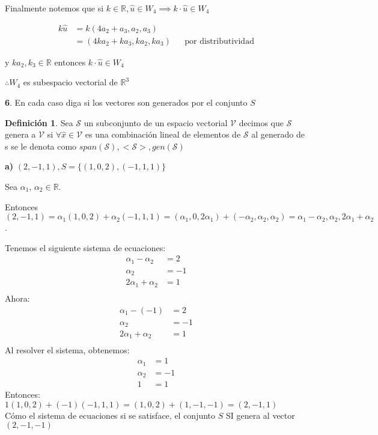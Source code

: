\documentclass[letterpaper]{article}
\newcommand{\R}{\mathds{R}}
\renewcommand{\*}{\cdot}
\theoremstyle{definition}
\newtheorem{definition}{Definición}
\begin{document}
Finalmente notemos que si $ k \in \R, \hat{u} \in W_4 \implies k\* \hat{u} \in W_4 $ 

\begin{align*}
	k\hat{u} & = k(4a_2 + a_3, a_2, a_3)\\
	 & = (4ka_2 + ka_3, ka_2, ka_3) && \text{por distributividad}
\end{align*}

y $ ka_2, k_3 \in \R $ entonces $ k\*\hat{u} \in W_4 $
\begin{center}
	$ \therefore W_4 $ es subespacio vectorial de $ \R^3 $
\end{center}


\noindent \textbf{6}. En cada caso diga si los vectores son generados por el conjunto $S$ \\

\begin{definition}
	Sea $ \mathcal{S} $ un subconjunto de un espacio vectorial $ \mathcal{V} $ decimos que $ \mathcal{S} $ genera a $ \mathcal{V} $ si $ \forall \hat{x} \in \mathcal{V} $ es una combinación lineal de elementos de $ \mathcal{S} $ al generado de s se le denota como $ span(\mathcal{S}), <\mathcal{S}>, gen(\mathcal{S})$ 
\end{definition}

\textbf{a)} $(2,-1,1), S =  \lbrace (1,0,2),(-1,1,1) \rbrace$

Sea $\alpha _1$, $\alpha _2 \in \mathbb{R}$.

Entonces $(2,-1,1) = \alpha _{1}(1,0,2) + \alpha _{2}(-1,1,1) = (\alpha _{1}, 0, 2\alpha _{1})+ (-\alpha _{2},\alpha _{2},\alpha _{2}) = \alpha _{1}-\alpha _{2},\alpha _{2},2\alpha _{1}+\alpha _{2}$.

Tenemos el siguiente sistema de ecuaciones:
\begin{align*}
\alpha_{1}-\alpha_{2}&= 2 \\
\alpha_{2} &= -1\\
2\alpha_{1}+\alpha_{2}&=1\\
\end{align*}
Ahora:
\begin{align*}
\alpha_{1} -(-1)&=2 \\
\alpha_{2}&=-1\\
2\alpha_{1} + \alpha_{2} &= 1\\
\end{align*}
Al resolver el sistema, obtenemos:
\begin{align*}
\alpha_{1}&=1 \\
\alpha_{2} &= -1 \\
1 &= 1
\end{align*}
Entonces:\\ $1(1,0,2) + (-1)(-1,1,1) = (1,0,2) + (1,-1,-1) = (2,-1,1)$\\
Cómo el sistema de ecuaciones si se satisface, el conjunto $S$ SI genera al vector $(2,-1,-1)$\\ \\
\end{document}
